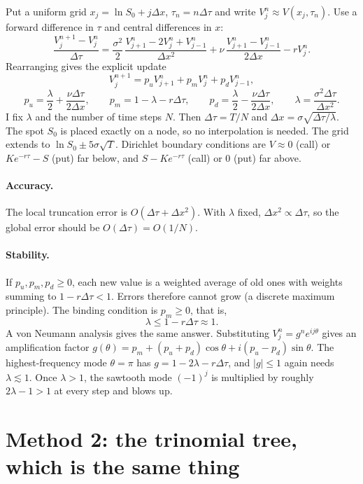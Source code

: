 \documentclass[11pt,a4paper]{article}
\newcommand{\Dt}{\Delta\tau}
\newcommand{\Dx}{\Delta x}
\begin{document}
Put a uniform grid $x_j=\ln S_0+j\Dx$, $\tau_n=n\Dt$ and write $V_j^n\approx V(x_j,\tau_n)$.
Use a forward difference in $\tau$ and central differences in $x$:
\[
\frac{V_j^{n+1}-V_j^n}{\Dt}=\frac{\sigma^2}{2}\,\frac{V_{j+1}^n-2V_j^n+V_{j-1}^n}{\Dx^2}
+\nu\,\frac{V_{j+1}^n-V_{j-1}^n}{2\Dx}-rV_j^n .
\]
Rearranging gives the explicit update
\begin{equation}\label{eq:explicit}
V_j^{n+1}=p_u V_{j+1}^n+p_m V_j^n+p_d V_{j-1}^n,
\end{equation}
\[
p_u=\frac{\lambda}{2}+\frac{\nu\Dt}{2\Dx},\qquad
p_m=1-\lambda-r\Dt,\qquad
p_d=\frac{\lambda}{2}-\frac{\nu\Dt}{2\Dx},\qquad
\lambda=\frac{\sigma^2\Dt}{\Dx^2}.
\]
I fix $\lambda$ and the number of time steps $N$. Then $\Dt=T/N$ and $\Dx=\sigma\sqrt{\Dt/\lambda}$.
The spot $S_0$ is placed exactly on a node, so no interpolation is needed. The grid
extends to $\ln S_0\pm5\sigma\sqrt T$. Dirichlet boundary conditions are
$V\approx0$ (call) or $Ke^{-r\tau}-S$ (put) far below, and $S-Ke^{-r\tau}$ (call) or $0$
(put) far above.

\paragraph{Accuracy.} The local truncation error is $O(\Dt+\Dx^2)$. With $\lambda$ fixed,
$\Dx^2\propto\Dt$, so the global error should be $O(\Dt)=O(1/N)$.

\paragraph{Stability.} If $p_u,p_m,p_d\ge0$, each new value is a weighted average of old ones
with weights summing to $1-r\Dt<1$. Errors therefore cannot grow (a discrete maximum principle).
The binding condition is $p_m\ge0$, that is,
\begin{equation}\label{eq:stab}
\lambda\le 1-r\Dt\approx 1 .
\end{equation}
A von Neumann analysis gives the same answer. Substituting $V_j^n=g^n e^{ij\theta}$ gives an
amplification factor $g(\theta)=p_m+(p_u+p_d)\cos\theta+i(p_u-p_d)\sin\theta$. The
highest-frequency mode $\theta=\pi$ has $g=1-2\lambda-r\Dt$, and $|g|\le1$ again needs
$\lambda\lesssim1$. Once $\lambda>1$, the sawtooth mode $(-1)^j$ is multiplied by roughly
$2\lambda-1>1$ at every step and blows up.

\section{Method 2: the trinomial tree, which is the same thing}
\end{document}
